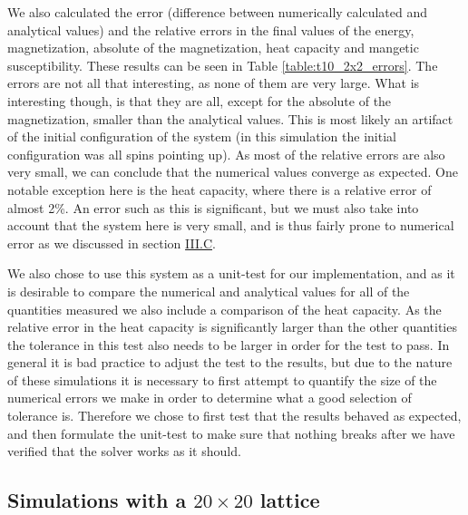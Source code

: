\documentclass[reprint,english,notitlepage]{revtex4-1}  %
\begin{document}
We also calculated the error (difference between numerically calculated and analytical values) and the relative errors in the final values of the energy, magnetization, absolute of the magnetization, heat capacity and mangetic susceptibility. These results can be seen in Table \ref{table:t10_2x2_errors}. The errors are not all that interesting, as none of them are very large. What is interesting though, is that they are all, except for the absolute of the magnetization, smaller than the analytical values. This is most likely an artifact of the initial configuration of the system (in this simulation the initial configuration was all spins pointing up). As most of the relative errors are also very small, we can conclude that the numerical values converge as expected. One notable exception here is the heat capacity, where there is a relative error of almost 2\%. An error such as this is significant, but we must also take into account that the system here is very small, and is thus fairly prone to numerical error as we discussed in section \hyperref[sec:III:C]{III.C}. 

We also chose to use this system as a unit-test for our implementation, and as it is desirable to compare the numerical and analytical values for all of the quantities measured we also include a comparison of the heat capacity. As the relative error in the heat capacity is significantly larger than the other quantities the tolerance in this test also needs to be larger in order for the test to pass. In general it is bad practice to adjust the test to the results, but due to the nature of these simulations it is necessary to first attempt to quantify the size of the numerical errors we make in order to determine what a good selection of tolerance is. Therefore we chose to first 
test that the results behaved as expected, and then formulate the unit-test to make sure that nothing breaks after we have verified that the solver works as it should.

\subsection{Simulations with a $20 \times 20$ lattice} \label{sec:V:C}
\end{document}
